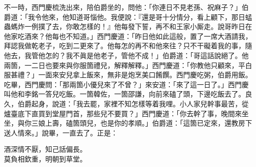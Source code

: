 不一時，西門慶梳洗出來，陪伯爵坐的，問他：「你連日不見老孫、祝麻子？」伯爵道：「我令他來，他知道哥惱他。我便說：『還是哥十分情分，看上顧下，那日蜢蟲螞炸一例撲了去，你敢怎樣的！』他每發下誓，再不和王家小厮走。說哥昨日在他家吃酒來？他每也不知道。」西門慶道：「昨日他如此這般，置了一席大酒請我，拜認我做乾老子，吃到二更來了。他每怎的再不和他來往？只不干礙着我的事，隨他去，我管他怎的？我不眞是他老子，管他不成！」{}伯爵道：「哥這話說絕了。他兩箇，一二日也要來與你服箇禮兒，解釋解釋。」西門慶道：「你教他只顧來，平白服甚禮？」一面來安兒拿上飯來，無非是炮烹美口餚饌。西門慶吃粥，伯爵用飯。吃畢，西門慶問：「那兩箇小優兒來了不曾？」來安道：「來了這一日了。」西門慶叫他和李銘一答兒吃飯。一箇韓佐，一箇邵謙，向前來磕了頭，下邊吃飯去了。良久，伯爵起身，說道：「我去罷，家裡不知怎樣等着我哩。小人家兒幹事最苦，從爐臺底下直買到堂屋門首，那些兒不要買？」西門慶道：「你去幹了事，晚間來坐坐，與你三娘上壽，磕箇頭兒，也是你的孝順。」伯爵道：「這箇已定來，還教房下送人情來。」說畢，一直去了。正是：

\begin{myquote}
酒深情不厭，知己話偏長。\\莫負相欽重，明朝到草堂。
\end{myquote}

